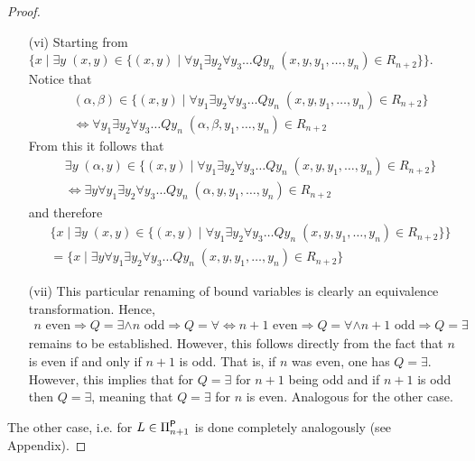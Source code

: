 \documentclass [11pt]{article}
\newcommand{\ccfont}[1]{\protect\mathsf{#1}}
\newcommand{\Ptime}{\ccfont{P}}
\newcommand{\php}[1]{\Pi_{#1}^{\Ptime}}
\newcommand{\sto}{\Rightarrow}
\begin{document}
\begin{proof}
\begin{enumerate}
\item[(vi)] Starting from $\{x \mid \exists y \; (x,y) \in  \{(x,y) \mid \forall y_1 \exists y_2\forall y_3\dots Q y_n  \; (x,y,y_1,\ldots,y_n) \in R_{n+2}\}\}$. Notice that 
\begin{equation*}
\begin{split}
 &(\alpha, \beta) \in \{(x,y) \mid \forall y_1 \exists y_2\forall y_3\dots Q y_n  \; (x,y,y_1,\ldots,y_n) \in R_{n+2}\} \\ 
 &\iff \forall y_1 \exists y_2\forall y_3\dots Q y_n  \; (\alpha, \beta,y_1,\ldots,y_n) \in R_{n+2}
\end{split}
\end{equation*}
From this it follows that 
\begin{equation*}
\begin{split}
 &\exists y \; (\alpha,y) \in  \{(x,y) \mid \forall y_1 \exists y_2\forall y_3\dots Q y_n  \; (x,y,y_1,\ldots,y_n) \in R_{n+2}\} \\ 
 &\iff \exists y \forall y_1 \exists y_2\forall y_3\dots Q y_n  \; (\alpha, y,y_1,\ldots,y_n) \in R_{n+2}
\end{split}
\end{equation*}
and therefore
\begin{equation*}
\begin{split}
 &\{x \mid \exists y \; (x,y) \in  \{(x,y) \mid \forall y_1 \exists y_2\forall y_3\dots Q y_n  \; (x,y,y_1,\ldots,y_n) \in R_{n+2}\}\}\\ 
 &= \{x \mid \exists y \forall y_1 \exists y_2\forall y_3\dots Q y_n  \; (x,y,y_1,\ldots,y_n) \in R_{n+2}\}
\end{split}
\end{equation*}


\item[(vii)] This particular renaming of bound variables is clearly an equivalence transformation. Hence, 
\begin{equation*}
\begin{split}
n \text{ even}  \sto Q=\exists \land n \text{ odd}  \sto Q=\forall  \iff  n+1 \text{ even}  \sto Q=\forall \land n+1 \text{ odd}  \sto Q=\exists 
\end{split}
\end{equation*}
remains to be established. However, this follows directly from the fact that $n$ is even if and only if $n+1$ is odd. That is, 
if $n$ was even, one has $Q=\exists$. However, this implies that for $Q=\exists$ for $n+1$ being odd and if $n+1$ is odd then $Q=\exists$, meaning that $Q=\exists$ for $n$ is even.
Analogous for the other case.
\end{enumerate}
\bigskip
The other case, i.e. for $L \in \php{n+1}$ is done completely analogously (see Appendix).
\end{proof}
\end{document}
